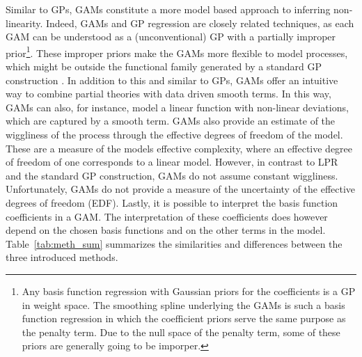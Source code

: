 \documentclass[man, floatsintext]{apa7}
\begin{document}
Similar to GPs, GAMs constitute a more model based approach to inferring
non-linearity. Indeed, GAMs and GP regression are closely related techniques,
as each GAM can be understood as a (unconventional) GP with a partially
improper prior\footnote{Any basis function regression with Gaussian priors for
  the coefficients is a GP in weight space. The smoothing spline underlying the
  GAMs is such a basis function regression in which the coefficient priors
  serve
  the same purpose as the penalty term. Due to the null space of the penalty
  term, some of these priors are generally going to be imporper.}. These
improper
priors make the GAMs more flexible to model processes, which might be outside
the functional family generated by a standard GP construction
\parencite{wahba_improper_1978}. In addition to this and similar to GPs, GAMs
offer an intuitive way to combine partial theories with data driven smooth
terms. In this way, GAMs can also, for instance, model a linear function with
non-linear deviations, which are captured by a smooth term. GAMs also provide
an estimate of the wiggliness of the process through the effective degrees of
freedom of the model. These are a measure of the models effective complexity,
where an effective degree of freedom of one corresponds to a linear model.
However, in contrast to LPR and the standard GP construction, GAMs do not
assume constant wiggliness. Unfortunately, GAMs do not provide a measure of the
uncertainty of the effective degrees of freedom (EDF). Lastly, it is possible
to
interpret the basis function coefficients in a GAM\@. The interpretation of
these coefficients does however depend on the chosen basis functions and on the
other terms in the model. Table~\ref{tab:meth_sum} summarizes the
similarities and differences between the three introduced methods.
\end{document}
